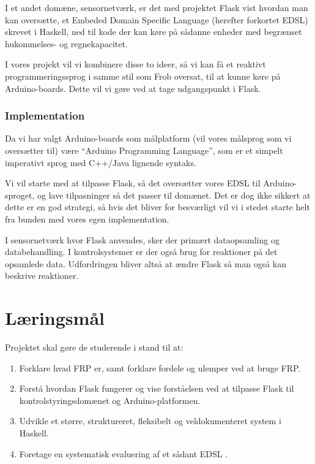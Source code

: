 \documentclass[a4paper,oneside, draft]{memoir}
\newcommand{\EDSL}{Embeded Domain Specific Language (herefter forkortet
  EDSL) \renewcommand{\EDSL}{ EDSL }}
\begin{document}
I et andet domæne, sensornetværk, er det med projektet Flask\cite{flask08} vist
hvordan man kan oversætte, et \EDSL skrevet i Haskell, ned til kode der
kan køre på sådanne enheder med begrænset hukommelses- og
regnekapacitet. 

I vores projekt vil vi kombinere disse to ideer, så vi kan få et reaktivt
programmeringssprog i samme stil som Frob oversat, til at kunne køre på
Arduino-boards. Dette vil vi gøre ved at tage udgangspunkt i Flask.  


\subsubsection{Implementation}
Da vi har valgt Arduino-boards som målplatform (vil vores målsprog
som vi oversætter til) være "`Arduino Programming Language"', som er et
simpelt imperativt sprog med C++/Java lignende syntaks.

Vi vil starte med at tilpasse Flask, så det oversætter vores \EDSL til
Arduino-sproget, og lave tilpasninger så det passer til domænet. Det
er dog ikke sikkert at dette er en god strategi, så hvis det bliver for
besværligt vil vi i stedet starte helt fra bunden med vores egen
implementation.

I sensornetværk hvor Flask anvendes, sker der primært dataopsamling og
databehandling. I kontrolsystemer er der også brug for reaktioner på
det opsamlede data. Udfordringen bliver altså at ændre Flask så man
også kan beskrive reaktioner.

\section{Læringsmål}

Projektet skal gøre de studerende i stand til at:

\begin{enumerate}
\item Forklare hvad FRP er, samt forklare fordele og ulemper ved at bruge FRP.

\item Forstå hvordan Flask fungerer og vise forståelsen ved at
  tilpasse Flask til kontrolstyringsdomænet og Arduino-platformen.

\item Udvikle et større, struktureret, fleksibelt og veldokumenteret
  system i Haskell.

\item Foretage en systematisk evaluering af et sådant \EDSL.
\end{enumerate}
\end{document}
